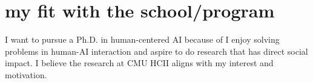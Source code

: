 
\section{my fit with the school/program}
I want to pursue a Ph.D. in human-centered AI because of I enjoy solving problems in human-AI interaction and aspire to do research that has direct social impact. 
I believe the research at CMU HCII aligns with my interest and motivation.

